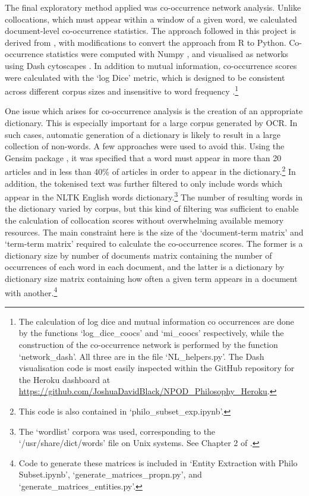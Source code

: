 \documentclass{article}
\begin{document}
The final exploratory method applied was co-occurrence network analysis. Unlike collocations, which must appear within a window of a given word, we calculated document-level co-occurrence statistics. The approach followed in this project is derived from \cite{cooccurrence-tutorial}, with modifications to convert the approach from R to Python. Co-occurrence statistics were computed with Numpy \cite{harris2020array}, and visualised as networks using Dash cytoscapes \cite{plotly}. In addition to mutual information, co-occurrence scores were calculated with the `log Dice' metric, which is designed to be consistent across different corpus sizes and insensitive to word frequency \cite{logdice}.\footnote{The calculation of log dice and mutual information co occurrences are done by the functions `log\_\-dice\_\-coocs' and `mi\_\-coocs' respectively, while the construction of the co-occurrence network is performed by the function `network\_\-dash'. All three are in the file `NL\_\-helpers.py'. The Dash visualisation code is most easily inspected within the GitHub repository for the Heroku dashboard at \url{https://github.com/JoshuaDavidBlack/NPOD_Philosophy_Heroku}.}

One issue which arises for co-occurrence analysis is the creation of an appropriate dictionary. This is especially important for a large corpus generated by OCR. In such cases, automatic generation of a dictionary is likely to result in a large collection of non-words. A few approaches were used to avoid this. Using the Gensim package \cite{gensim}, it was specified that a word must appear in more than 20 articles and in less than 40\% of articles in order to appear in the dictionary.\footnote{This code is also contained in `philo\_\-subset\_\-exp.ipynb'.} In addition, the tokenised text was further filtered to only include words which appear in the NLTK English words dictionary.\footnote{The `wordlist' corpora was used, corresponding to the `/usr/share/dict/words' file on Unix systems. See Chapter 2 of \cite{bird-2009}.}
The number of resulting words in the dictionary varied by corpus, but this kind of filtering was sufficient to enable the calculation of collocation scores without overwhelming available memory resources. The main constraint here is the size of the `document-term matrix' and `term-term matrix' required to calculate the co-occurrence scores. The former is a dictionary size by number of documents matrix containing the number of occurrences of each word in each document, and the latter is a dictionary by dictionary size matrix containing how often a given term appears in a document with another.\footnote{Code to generate these matrices is included in `Entity Extraction with Philo Subset.ipynb', `generate\_\-matrices\_\-propn.py', and `generate\_\-matrices\_\-entities.py'.}
\end{document}
